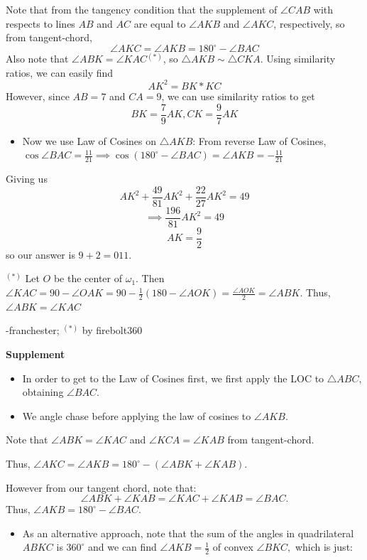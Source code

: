 \begin{enumerate}
 
Note that from the tangency condition that the supplement of $\angle CAB$ with respects to lines $AB$ and $AC$ are equal to $\angle AKB$ and $\angle AKC$, respectively, so from tangent-chord, 
 \[\angle AKC=\angle AKB=180^{\circ}-\angle BAC\] Also note that $\angle ABK=\angle KAC$$^{(*)}$, so $\triangle AKB\sim \triangle CKA$. Using similarity ratios, we can easily find 
 \[AK^2=BK*KC\] However, since $AB=7$ and $CA=9$, we can use similarity ratios to get 
 \[BK=\frac{7}{9}AK, CK=\frac{9}{7}AK\]

            \begin{itemize}
        \item Now we use Law of Cosines on $\triangle AKB$: From reverse Law of Cosines, $\cos{\angle BAC}=\frac{11}{21}\implies \cos{(180^{\circ}-\angle BAC)}=\angle AKB=-\frac{11}{21}$
            \end{itemize}
            Giving us 
 \[AK^2+\frac{49}{81}AK^2+\frac{22}{27}AK^2=49\] 
 \[\implies \frac{196}{81}AK^2=49\] 
 \[AK=\frac{9}{2}\] so our answer is $9+2=\boxed{011}$.

 $^{(*)}$ Let $O$ be the center of $\omega_1$. Then $\angle KAC = 90 - \angle OAK = 90 - \frac{1}{2}(180 - \angle AOK) = \frac{\angle AOK}{2} = \angle ABK$. Thus, $\angle ABK = \angle KAC$

 -franchester; $^{(*)}$ by firebolt360

 \textbf{Supplement} 
            \begin{itemize}
        \item In order to get to the Law of Cosines first, we first apply the LOC to $\triangle{ABC},$ obtaining $\angle{BAC}.$
        \item We angle chase before applying the law of cosines to $\angle{AKB}.$
            \end{itemize}
            Note that $\angle{ABK}=\angle{KAC}$ and $\angle{KCA}=\angle{KAB}$ from tangent-chord. 

 Thus, $\angle{AKC}=\angle{AKB}=180^{\circ}-(\angle{ABK}+\angle{KAB}).$ 

 However from our tangent chord, note that:
 \[\angle{ABK}+\angle{KAB}=\angle{KAC}+\angle{KAB}=\angle{BAC}.\]Thus, $\angle{AKB}=180^\circ-\angle{BAC}.$

            \begin{itemize}
        \item As an alternative approach, note that the sum of the angles in quadrilateral $ABKC$ is $360^{\circ}$ and we can find $\angle{AKB}=\frac12$ of convex $\angle{BKC},$ which is just:
            \end{itemize}
            

\end{enumerate}
